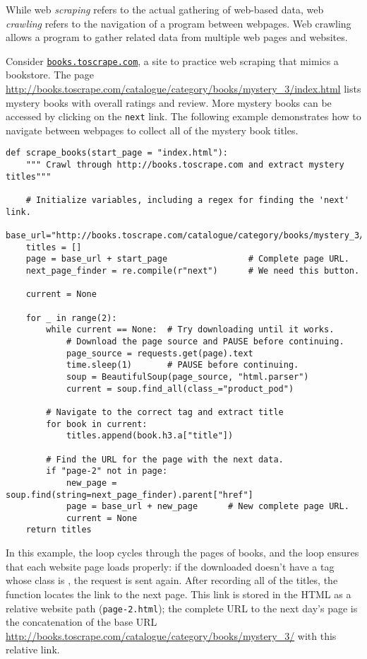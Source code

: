 While web \emph{scraping} refers to the actual gathering of web-based data, web \emph{crawling} refers to the navigation of a program between webpages.
Web crawling allows a program to gather related data from multiple web pages and websites.

Consider \href{http://books.toscrape.com}{\texttt{books.toscrape.com}}, a site to practice web scraping that mimics a bookstore.
The page \url{http://books.toscrape.com/catalogue/category/books/mystery_3/index.html} lists mystery books with overall ratings and review.
More mystery books can be accessed by clicking on the \texttt{next} link.
The following example demonstrates how to navigate between webpages to collect all of the mystery book titles.

\begin{lstlisting}
def scrape_books(start_page = "index.html"):
    """ Crawl through http://books.toscrape.com and extract mystery titles"""

    # Initialize variables, including a regex for finding the 'next' link.
    base_url="http://books.toscrape.com/catalogue/category/books/mystery_3/"
    titles = []
    page = base_url + start_page                # Complete page URL.
    next_page_finder = re.compile(r"next")      # We need this button.

    current = None

    for _ in range(2):
        while current == None:  # Try downloading until it works.
            # Download the page source and PAUSE before continuing.
            page_source = requests.get(page).text
            time.sleep(1)       # PAUSE before continuing.
            soup = BeautifulSoup(page_source, "html.parser")
            current = soup.find_all(class_="product_pod")

        # Navigate to the correct tag and extract title
        for book in current:
            titles.append(book.h3.a["title"])

        # Find the URL for the page with the next data.
        if "page-2" not in page:
            new_page = soup.find(string=next_page_finder).parent["href"]
            page = base_url + new_page      # New complete page URL.
            current = None
    return titles

\end{lstlisting}

In this example, the  loop cycles through the pages of books, and the  loop ensures that each website page loads properly: if the downloaded  doesn't have a tag whose class is , the request is sent again.
After recording all of the titles, the function locates the link to the next page.
This link is stored in the HTML as a relative website path (\texttt{page-2.html}); the complete URL to the next day's page is the concatenation of the base URL \url{http://books.toscrape.com/catalogue/category/books/mystery_3/} with this relative link.

